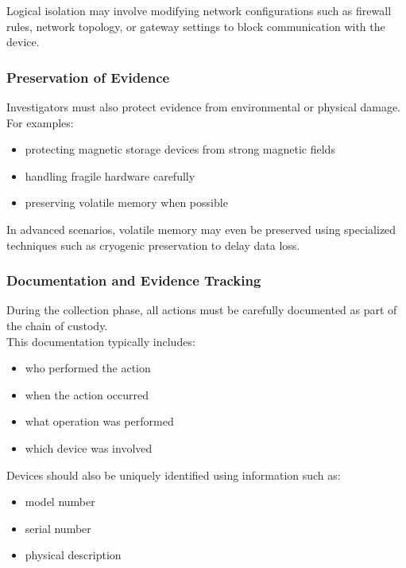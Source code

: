 \noindent
Logical isolation may involve modifying network configurations such as firewall rules, network topology, or gateway settings to block communication with the device.

\subsubsection{Preservation of Evidence}

Investigators must also protect evidence from environmental or physical damage.\\
For examples:

\begin{itemize}
\item protecting magnetic storage devices from strong magnetic fields
\item handling fragile hardware carefully
\item preserving volatile memory when possible
\end{itemize}

In advanced scenarios, volatile memory may even be preserved using specialized techniques such as cryogenic preservation to delay data loss.

\subsubsection{Documentation and Evidence Tracking}

During the collection phase, all actions must be carefully documented as part of the chain of custody.\\

This documentation typically includes:

\begin{itemize}
\item who performed the action
\item when the action occurred
\item what operation was performed
\item which device was involved
\end{itemize}

\noindent
Devices should also be uniquely identified using information such as:

\begin{itemize}
\item model number
\item serial number
\item physical description
\end{itemize}

